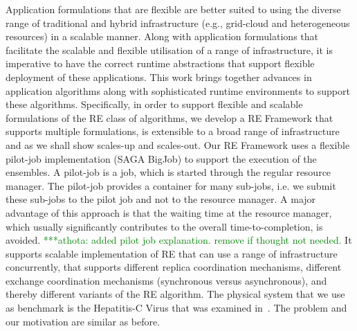 \documentclass{rspublic}
\newcommand{\athotanote}[1]{ {\textcolor{green} { ***athota: #1 }}}
\newcommand{\athotanote}[1]{}
\begin{document}
Application formulations that are flexible are better suited to using
the diverse range of traditional and hybrid infrastructure (e.g.,
grid-cloud and heterogeneous resources) in a scalable manner.  Along
with application formulations that facilitate the scalable and
flexible utilisation of a range of infrastructure, it is imperative to
have the correct runtime abstractions that support flexible deployment
of these applications. This work brings together advances in
application algorithms along with sophisticated runtime environments
to support these algorithms. Specifically, in order to support
flexible and scalable formulations of the RE class of algorithms, we
develop a RE Framework that supports multiple formulations, is
extensible to a broad range of infrastructure and as we shall show
scales-up and scales-out.  Our RE Framework uses a flexible
pilot-job implementation (SAGA BigJob) to support the execution of the
ensembles. A pilot-job is a job, which is started through the regular resource manager. The pilot-job provides a container for many sub-jobs, i.e. we submit these sub-jobs to the pilot job and not to the resource manager. A major advantage of this approach is that the waiting time at the resource manager, which usually significantly contributes to the overall time-to-completion, is avoided. \athotanote{added pilot job explanation. remove if thought not needed.}
It supports scalable implementation of RE that can use
a range of infrastructure concurrently, that supports different replica
coordination mechanisms, different exchange coordination mechanisms
(synchronous versus asynchronous), and thereby different variants of
the RE algorithm. The physical system that we use as benchmark is the
Hepatitis-C Virus that was examined in~\cite{Luckow:2008fp}. The
problem and our motivation are similar as before.

\end{document}

